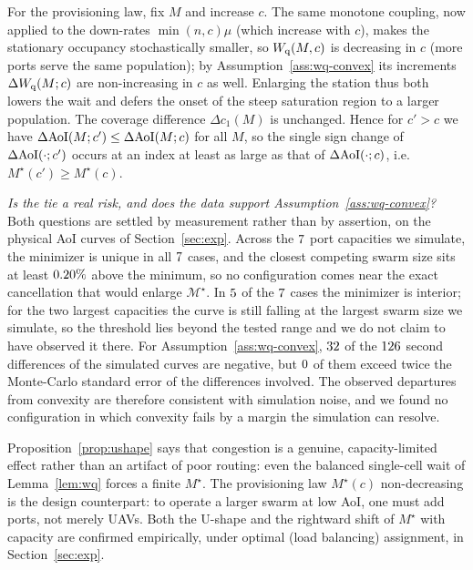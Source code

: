 \begin{IEEEproof}
For the provisioning law, fix $M$ and increase $c$. The same monotone coupling,
now applied to the down-rates $\min(n,c)\mu$ (which increase with $c$), makes the
stationary occupancy stochastically smaller, so $W_{\mathrm q}(M,c)$ is decreasing in $c$
(more ports serve the same population); by Assumption~\ref{ass:wq-convex} its
increments $\Delta W_{\mathrm q}(M;c)$ are non-increasing in $c$ as well. Enlarging the
station thus both lowers the wait and defers the onset of the steep saturation
region to a larger population. The coverage difference $\Delta c_1(M)$ is
unchanged. Hence for $c'>c$ we have $\Delta\mathrm{AoI}(M;c')\le\Delta\mathrm{AoI}(M;c)$ for all
$M$, so the single sign change of $\Delta\mathrm{AoI}(\cdot;c')$ occurs at an index at
least as large as that of $\Delta\mathrm{AoI}(\cdot;c)$, i.e. $M^\star(c')\ge M^\star(c)$.
\end{IEEEproof}

\noindent
\emph{Is the tie a real risk, and does the data support Assumption~\ref{ass:wq-convex}?}
Both questions are settled by measurement rather than by assertion, on the
physical AoI curves of Section~\ref{sec:exp}. Across the $7$ port
capacities we simulate, the minimizer is unique in all $7$ cases, and
the closest competing swarm size sits at least $0.20\%$ above the
minimum, so no configuration comes near the exact cancellation that would enlarge
$\mathcal{M}^\star$. In $5$ of the $7$ cases the minimizer
is interior; for the two largest capacities the curve is still falling at the
largest swarm size we simulate, so the threshold lies beyond the tested range and
we do not claim to have observed it there. For
Assumption~\ref{ass:wq-convex}, $32$ of the $126$ second
differences of the simulated curves are negative, but $0$ of them
exceed twice the Monte-Carlo standard error of the differences involved. The
observed departures from convexity are therefore consistent with simulation
noise, and we found no configuration in which convexity fails by a margin the
simulation can resolve.

\noindent
Proposition~\ref{prop:ushape} says that congestion is a genuine, capacity-limited
effect rather than an artifact of poor routing: even the balanced single-cell wait
of Lemma~\ref{lem:wq} forces a finite $M^\star$. The provisioning law
$M^\star(c)$ non-decreasing is the design counterpart: to operate a larger swarm
at low AoI, one must add ports, not merely UAVs. Both the U-shape and the rightward
shift of $M^\star$ with capacity are confirmed empirically, under optimal (load
balancing) assignment, in Section~\ref{sec:exp}.

